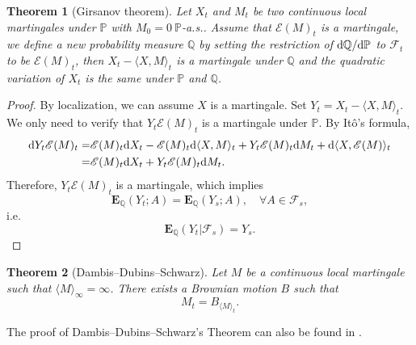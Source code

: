 \documentclass[twoside, 12pt]{book}
\numberwithin{equation}{chapter}
\newtheorem{theorem}{Theorem}[section]
\def\cF{{\mathcal F}}
\def\mP{{\mathbb P}}
\def\mQ{{\mathbb Q}}
\def\bE{{\mathbf E}}
\def\sE{{\mathscr E}}
\def\<{\langle}
\def\>{\rangle}
\def\d{\text{\rm{d}}}
\begin{document}
	\begin{theorem}[Girsanov theorem]
		Let $X_t$ and $M_t$ be two continuous local martingales under $\mP$ with $M_0=0 ~  \mP$-a.s..  Assume that $\sE(M)_t$ is a martingale, we define a new probability measure $\mQ$ by setting the restriction of $\d\mQ/\d\mP$ to $\cF_t$ to be $\sE(M)_t$, then $X_t-\langle X, M \rangle_t$ is a martingale under $\mQ$ and the quadratic variation of $X_t$ is the same under $\mP$ and $\mQ$. 
	\end{theorem}
	\begin{proof}
		By localization, we can assume $X$ is a martingale. Set $Y_t=X_t-\<X,M\>_t$. We only need to verify that $Y_t\sE(M)_t$ is a martingale under $\mP$. By Itô's formula, 
		\[
		  \begin{aligned}
		  	\d Y_t \sE(M)_t=& \sE(M)_t \d X_t- \sE(M)_t \d \<X,M\>_t+ Y_t \sE(M)_t \d M_t+ \d \<X, \sE(M)\>_t \\
		  	=& \sE(M)_t \d X_t+ Y_t \sE(M)_t \d M_t. 
		  \end{aligned}
		\]
		Therefore, $Y_t\sE(M)_t$ is a martingale, which implies 
		$$
		    \bE_{\mQ} (Y_t; A) = \bE_{\mQ} (Y_s; A), \quad \forall A\in \cF_s, 
		$$
		i.e. 
		\[
		    \bE_{\mQ}(Y_t|\cF_s)= Y_s. 
		\]
	\end{proof}
	
	\begin{theorem}[Dambis–Dubins–Schwarz]\label{thm:DDS}
		Let $M$ be a continuous local martingale such that $\<M\>_\infty=\infty$. There exists a Brownian motion $B$ such that 
		$$
		    M_t=B_{\<M\>_t}. 
		$$
	\end{theorem}
    The proof of Dambis–Dubins–Schwarz's Theorem can also be found in \cite{Huang}. 
\end{document}
